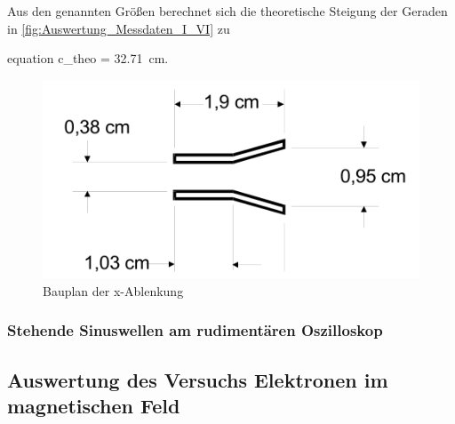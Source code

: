 		Aus den genannten Größen berechnet sich die theoretische Steigung der 
		Geraden in \cref{fig:Auswertung_Messdaten_I_VI} zu
		\begin{empheq}{equation} 
			c_{theo} = \SI{32.71}{\centi\meter}.
		\end{empheq}	
		\begin{figure}[!h]
			\centering
			\includegraphics[scale=0.7]{Grafiken/Bauplan.PNG}
			\caption{Bauplan der x-Ablenkung}\label{fig:Auswertung_Bauplan}
		\end{figure}
		
	\subsubsection{Stehende Sinuswellen am rudimentären Oszilloskop}

		

\subsection{Auswertung des Versuchs Elektronen im magnetischen Feld}